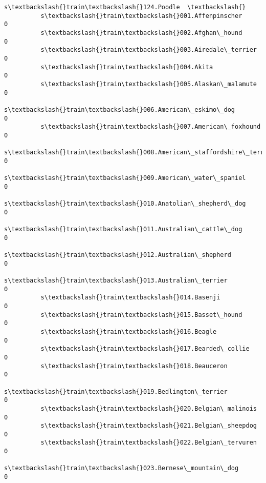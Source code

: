 \documentclass[11pt]{article}
\begin{document}
\begin{Verbatim}[commandchars=\\\{\}]
                                                          s\textbackslash{}train\textbackslash{}124.Poodle  \textbackslash{}
          s\textbackslash{}train\textbackslash{}001.Affenpinscher                                        0   
          s\textbackslash{}train\textbackslash{}002.Afghan\_hound                                         0   
          s\textbackslash{}train\textbackslash{}003.Airedale\_terrier                                     0   
          s\textbackslash{}train\textbackslash{}004.Akita                                                0   
          s\textbackslash{}train\textbackslash{}005.Alaskan\_malamute                                     0   
          s\textbackslash{}train\textbackslash{}006.American\_eskimo\_dog                                  0   
          s\textbackslash{}train\textbackslash{}007.American\_foxhound                                    0   
          s\textbackslash{}train\textbackslash{}008.American\_staffordshire\_terrier                       0   
          s\textbackslash{}train\textbackslash{}009.American\_water\_spaniel                               0   
          s\textbackslash{}train\textbackslash{}010.Anatolian\_shepherd\_dog                               0   
          s\textbackslash{}train\textbackslash{}011.Australian\_cattle\_dog                                0   
          s\textbackslash{}train\textbackslash{}012.Australian\_shepherd                                  0   
          s\textbackslash{}train\textbackslash{}013.Australian\_terrier                                   0   
          s\textbackslash{}train\textbackslash{}014.Basenji                                              0   
          s\textbackslash{}train\textbackslash{}015.Basset\_hound                                         0   
          s\textbackslash{}train\textbackslash{}016.Beagle                                               0   
          s\textbackslash{}train\textbackslash{}017.Bearded\_collie                                       0   
          s\textbackslash{}train\textbackslash{}018.Beauceron                                            0   
          s\textbackslash{}train\textbackslash{}019.Bedlington\_terrier                                   0   
          s\textbackslash{}train\textbackslash{}020.Belgian\_malinois                                     0   
          s\textbackslash{}train\textbackslash{}021.Belgian\_sheepdog                                     0   
          s\textbackslash{}train\textbackslash{}022.Belgian\_tervuren                                     0   
          s\textbackslash{}train\textbackslash{}023.Bernese\_mountain\_dog                                 0   

\end{Verbatim}
\end{document}
